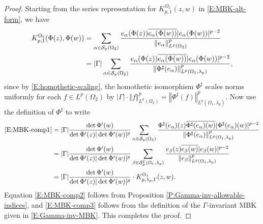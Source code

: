 \documentclass[letterpaper,11pt,reqno]{amsart}
\theoremstyle{plain}
\theoremstyle{definition}
\theoremstyle{remark}
\theoremstyle{remark}
\numberwithin{equation}{section}
\newcommand{\norm}[1]{\left\Vert#1\right\Vert}
\newcommand{\ol}{\overline}
\newcommand{\cs}{{\mathcal S}}
\begin{document}
\begin{proof}
Starting from the series representation for $K^{\Omega_2}_{p,1}(z,w)$ in \eqref{E:MBK-alt-form}, we have
\begin{align}
    K_{p,1}^{\Omega_2}(\Phi(z),\Phi(w)) &= \sum_{\alpha\in\cs_p(\Omega_2)} \frac{e_\alpha(\Phi(z))\ol{e_\alpha(\Phi(w))} | e_\alpha(\Phi(w))|^{p-2} }{\norm{e_\alpha}^p_{L^p(\Omega_2)}} \notag \\
    &= |\Gamma| \sum_{\alpha\in\cs_p(\Omega_2)} \frac{e_\alpha(\Phi(z))\ol{e_\alpha(\Phi(w))} | e_\alpha(\Phi(w))|^{p-2} }{\norm{\Phi^\sharp(e_\alpha)}^p_{L^p(\Omega_1,\lambda_p)}}, \label{E:MBK-comp1}
\end{align}
since by \eqref{E:homothetic-scaling}, the homothetic isomorphism $\Phi^\sharp$ scales norms uniformly for each $f \in L^p(\Omega_2)$ by
$|\Gamma|\cdot\norm{f}_{L^p(\Omega_2)}^p = \norm{\Phi^\sharp(f)}^p_{L^p(\Omega_1,\lambda_p)}$.  Now use the definition of $\Phi^\sharp$ to write
\begin{align}
    \eqref{E:MBK-comp1} &= |\Gamma| \frac{\det \Phi'(w)}{\det \Phi'(z)|\det \Phi'(w)|^p} \sum_{\alpha\in\cs_p(\Omega_2)} \frac{\Phi^\sharp (e_\alpha)(z)\ol{\Phi^\sharp(e_\alpha)(w)} | \Phi^\sharp(e_\alpha)(w)|^{p-2} }{\norm{\Phi^\sharp(e_\alpha)}^p_{L^p(\Omega_1,\lambda_p)}} \notag \\ 
    &= |\Gamma| \frac{\det \Phi'(w)}{\det \Phi'(z)|\det \Phi'(w)|^p} \sum_{\beta\in\cs_p^\Gamma(\Omega_1,\lambda_p)} \frac{e_\beta(z)\ol{e_\beta(w)}|e_\beta(w)|^{p-2}}{\norm{e_\beta}^p_{L^p(\Omega_1,\lambda_p)}} \label{E:MBK-comp2} \\
    &= |\Gamma| \frac{\det \Phi'(w)}{\det \Phi'(z)|\det \Phi'(w)|^p} \cdot K^{\Omega_1}_{p,\lambda_p,\Gamma}(z,w). \label{E:MBK-comp3}
\end{align}
Equation \eqref{E:MBK-comp2} follows from Proposition \ref{P:Gamma-inv-allowable-indices}, and \eqref{E:MBK-comp3} follows from the definition of the $\Gamma$-invariant MBK given in \eqref{E:Gamma-inv-MBK}.
This completes the proof.
\end{proof}
\end{document}
